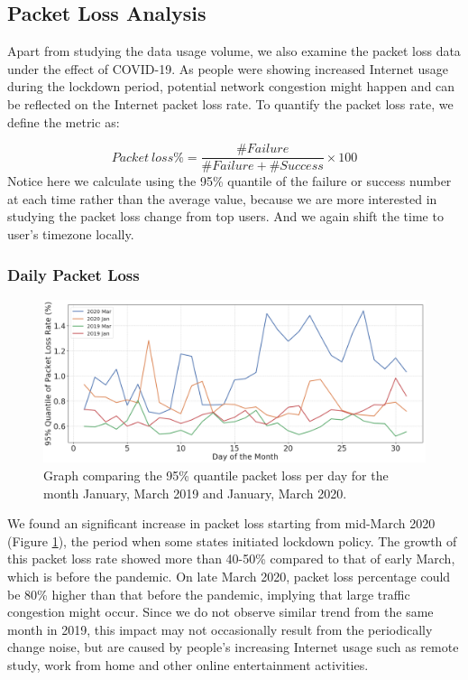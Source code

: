 

\subsection{Packet Loss Analysis}
Apart from studying the data usage volume, we also examine the packet loss data under the effect of COVID-19. As people were showing increased Internet usage during the lockdown period, potential network congestion might happen and can be reflected on the Internet packet loss rate. To quantify the packet loss rate, we define the metric as:

\begin{equation}
    Packet \ loss \% = \frac{\#Failure }{\#Failure + \#Success} \times 100
\end{equation}
Notice here we calculate using the 95\% quantile of the failure or success number at each time rather than the average value, because we are more interested in studying the packet loss change from top users. And we again shift the time to user's timezone locally.

\subsubsection{Daily Packet Loss}


\begin{figure}[ht]
\centering
\includegraphics[width=1.0\linewidth]{figs/packet_loss_per_day.png}
\caption{Graph comparing the 95\% quantile packet loss per day for the month January, March 2019 and January, March 2020.}
\label{fig:packetlossperday}
\end{figure}
  
We found an significant increase in packet loss starting from mid-March 2020 (Figure \ref{fig:packetlossperday}), the period when some states initiated lockdown policy. The growth of this packet loss rate showed more than 40-50\% compared to that of early March, which is before the pandemic. On late March 2020, packet loss percentage could be 80\% higher than that before the pandemic, implying that large traffic congestion might occur. Since we do not observe similar trend from the same month in 2019, this impact may not occasionally result from the periodically change noise, but 
are caused by people's increasing Internet usage such as remote study, work from home and other online entertainment activities. 

